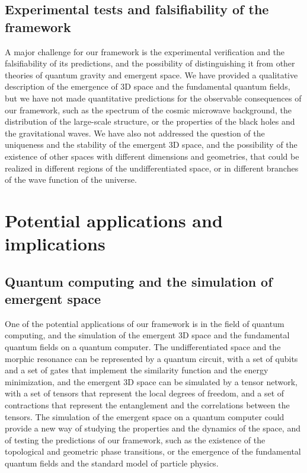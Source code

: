\subsection{Experimental tests and falsifiability of the framework}
A major challenge for our framework is the experimental verification and the falsifiability of its predictions, and the possibility of distinguishing it from other theories of quantum gravity and emergent space. We have provided a qualitative description of the emergence of 3D space and the fundamental quantum fields, but we have not made quantitative predictions for the observable consequences of our framework, such as the spectrum of the cosmic microwave background, the distribution of the large-scale structure, or the properties of the black holes and the gravitational waves. We have also not addressed the question of the uniqueness and the stability of the emergent 3D space, and the possibility of the existence of other spaces with different dimensions and geometries, that could be realized in different regions of the undifferentiated space, or in different branches of the wave function of the universe.

\section{Potential applications and implications}
\subsection{Quantum computing and the simulation of emergent space}
One of the potential applications of our framework is in the field of quantum computing, and the simulation of the emergent 3D space and the fundamental quantum fields on a quantum computer. The undifferentiated space and the morphic resonance can be represented by a quantum circuit, with a set of qubits and a set of gates that implement the similarity function and the energy minimization, and the emergent 3D space can be simulated by a tensor network, with a set of tensors that represent the local degrees of freedom, and a set of contractions that represent the entanglement and the correlations between the tensors. The simulation of the emergent space on a quantum computer could provide a new way of studying the properties and the dynamics of the space, and of testing the predictions of our framework, such as the existence of the topological and geometric phase transitions, or the emergence of the fundamental quantum fields and the standard model of particle physics.

